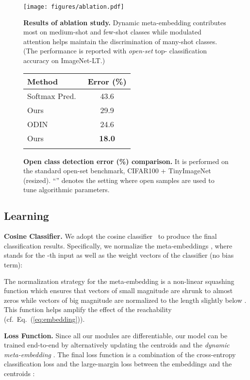 \documentclass[10pt,twocolumn,letterpaper]{article}
\begin{document}
\begin{figure*}[t]
\footnotesize
\parbox{.72\linewidth}{
\centering
\texttt{[image: figures/ablation.pdf]}
\caption{\textbf{Results of ablation study.} Dynamic meta-embedding contributes most on medium-shot and few-shot classes while modulated attention helps maintain the discrimination of many-shot classes. (The performance is reported with \emph{open-set} top- classification accuracy on ImageNet-LT.)}
\label{fig:ablation}
}
\hfill
\parbox{.25\linewidth}{
\centering
\begin{tabular}{lc}
\Xhline{1pt}
\textbf{Method} & \textbf{Error (\%)} \\
\hline\hline
Softmax Pred.~\cite{hendrycks2016baseline} & 43.6 \\
Ours & 29.9 \\
ODIN~\cite{liang2017enhancing} & 24.6 \\
Ours & \textbf{18.0} \\
\Xhline{1pt}
\end{tabular}
\captionsetup{type=table} \caption{\textbf{Open class detection error (\%) comparison.} It is performed on the standard open-set benchmark, CIFAR100 + TinyImageNet (resized). ``'' denotes the setting where open samples are used to tune algorithmic parameters.}
\label{tab:openset}
}
\end{figure*}



\subsection{Learning}

\noindent
\textbf{Cosine Classifier.}
We adopt the cosine classifier~\cite{qi2018low,gidaris2018dynamic} to produce the final classification results.
Specifically, we normalize the meta-embeddings , where  stands for the -th input as well as the weight vectors  of the classifier  (no bias term):

The normalization strategy for the meta-embedding is a non-linear squashing function \cite{sabour2017dynamic}
which ensures that vectors of small magnitude are shrunk to almost zeros while vectors of big magnitude are normalized to the length slightly below . This function helps amplify the effect of the reachability  (cf.\ Eq.~(\ref{eq:embedding})). 



\vspace{2pt}
\noindent
\textbf{Loss Function.}
Since all our modules are differentiable, our model can be trained end-to-end by alternatively updating the  centroids  and the \emph{dynamic meta-embedding} .
The final loss function  is a combination of the cross-entropy classification loss  and the large-margin loss between the embeddings and the centroids :
\end{document}

